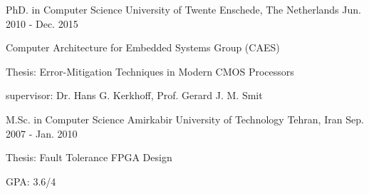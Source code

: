 

\begin{cventries}

  \cventry
    {PhD. in Computer Science} %
    {University of Twente} %
    {Enschede, The Netherlands} %
    {Jun. 2010 - Dec. 2015} %
    {
      \begin{cvitems} %
	\item {Computer Architecture for Embedded Systems Group (CAES)}
        \item {Thesis: Error-Mitigation Techniques in Modern CMOS Processors}
	\item {supervisor: Dr. Hans G. Kerkhoff, Prof. Gerard J. M. Smit}
      \end{cvitems}
    }

  \cventry
    {M.Sc. in Computer Science} %
    {Amirkabir University of Technology} %
    {Tehran, Iran} %
    {Sep. 2007 - Jan. 2010} %
    {
      \begin{cvitems} %
        \item {Thesis: Fault Tolerance FPGA Design}
	\item {GPA: 3.6/4}
      \end{cvitems}
    }
\end{cventries}
